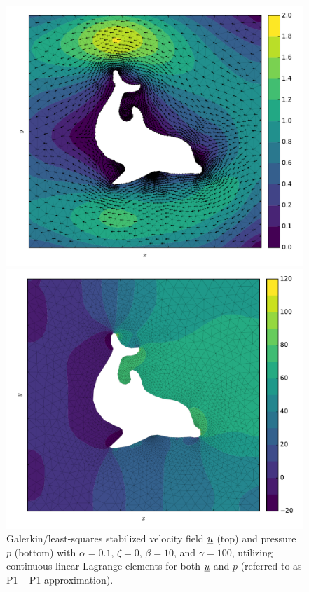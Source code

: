 \begin{figure}
  \centering
  \begin{minipage}[b]{0.60\linewidth}
    \includegraphics[width=\linewidth]{images/fenics_intro/2Dstokes_nitsche_u_stab.pdf}
  \end{minipage}
  \quad
  \begin{minipage}[b]{0.60\linewidth}
    \includegraphics[width=\linewidth]{images/fenics_intro/2Dstokes_nitsche_p_stab.pdf}
  \end{minipage}
  \caption[GLS stabilized slip-friction Stokes example]{Galerkin/least-squares stabilized velocity field $\underline{u}$ (top) and pressure $p$ (bottom) with $\alpha = 0.1$, $\zeta = 0$, $\beta = 10$, and $\gamma = 100$, utilizing continuous linear Lagrange elements for both $\underline{u}$ and $p$ (referred to as P1 -- P1 approximation).}
  \label{intro_stokes_2d_nitsche_stab}
\end{figure}

